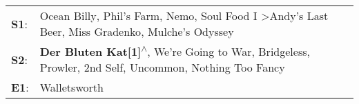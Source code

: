 \begin{supertabular}{p{0.03\textwidth}p{0.92\textwidth}}
 \textbf{S1}:  &          Ocean Billy\textsuperscript{}, \enspace Phil's Farm\textsuperscript{}, \enspace Nemo\textsuperscript{}, \enspace Soul Food I\textsuperscript{} \textgreater \enspace Andy's Last Beer\textsuperscript{}, \enspace Miss Gradenko\textsuperscript{}, \enspace Mulche's Odyssey\textsuperscript{}  \enspace  \\
 \textbf{S2}:  &  \textbf{Der Bluten Kat[1]\textsuperscript{$\wedge$}}, \enspace We're Going to War\textsuperscript{}, \enspace Bridgeless\textsuperscript{}, \enspace Prowler\textsuperscript{}, \enspace 2nd Self\textsuperscript{}, \enspace Uncommon\textsuperscript{}, \enspace Nothing Too Fancy\textsuperscript{}  \enspace  \\
 \textbf{E1}:  &                                                                                                                                                                                                                                                                          Walletsworth\textsuperscript{}  \enspace  \\
\end{supertabular}
